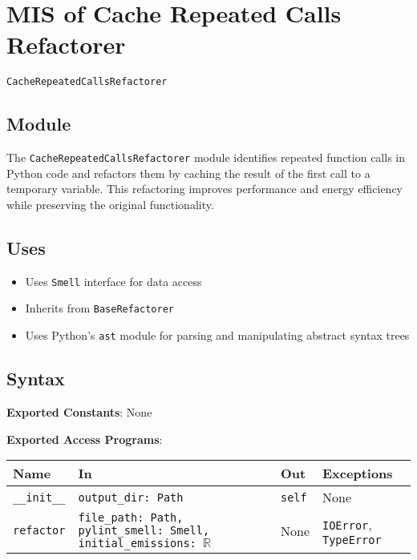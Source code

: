 \documentclass[12pt, titlepage]{article}
\begin{document}
\newpage

\section{MIS of Cache Repeated Calls Refactorer} \label{mis:CacheCalls}

\texttt{CacheRepeatedCallsRefactorer}

\subsection{Module}

The \texttt{CacheRepeatedCallsRefactorer} module identifies repeated function calls in Python code and refactors them by caching the result of the first call to a temporary variable. This refactoring improves performance and energy efficiency while preserving the original functionality.

\subsection{Uses}
\begin{itemize}
  \item Uses \texttt{Smell} interface for data access
  \item Inherits from \texttt{BaseRefactorer}
  \item Uses Python's \texttt{ast} module for parsing and manipulating abstract syntax trees
\end{itemize}

\subsection{Syntax}
\noindent
\textbf{Exported Constants}: None

\noindent
\textbf{Exported Access Programs}:\\
\begin{tabularx}{\linewidth}{|l|>{\raggedright\arraybackslash}X|l|l|}
  \hline
  \textbf{Name} & \textbf{In} & \textbf{Out} & \textbf{Exceptions} \\\hline
  \texttt{\_\_init\_\_} & \texttt{output\_dir: Path} & \texttt{self} & None \\
  \hline
  \texttt{refactor} & \texttt{file\_path: Path, pylint\_smell: Smell, initial\_emissions: $\mathbb{R}$} & None & \texttt{IOError}, \texttt{TypeError} \\
  \hline
\end{tabularx}
\end{document}
